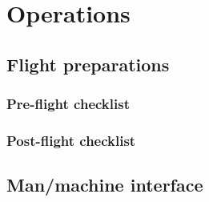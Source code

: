 \section*{Operations} \label{sec:op}

\subsection*{Flight preparations} \label{subsec:op-prep}



\subsubsection*{Pre-flight checklist}



\subsubsection*{Post-flight checklist}




\subsection*{Man/machine interface} \label{subsec:op-interface}

